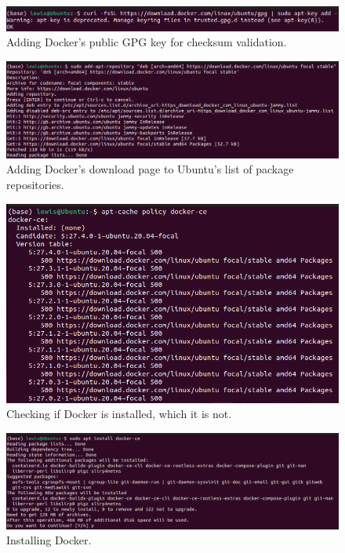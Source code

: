 \documentclass[12pt]{report}
\begin{document}
\begin{figure}[H]
    \centering
    \includegraphics[width=\linewidth]{Implementation/Docker/Installation/2.png}
    \caption{Adding Docker's public GPG key for checksum validation.}
    \label{fig:DockerInstall2}
\end{figure}

\begin{figure}[H]
    \centering
    \includegraphics[width=\linewidth]{Implementation/Docker/Installation/3.png}
    \caption{Adding Docker's download page to Ubuntu's list of package repositories.}
    \label{fig:DockerInstall3}
\end{figure}

\begin{figure}[H]
    \centering
    \includegraphics[width=\linewidth]{Implementation/Docker/Installation/4.png}
    \caption{Checking if Docker is installed, which it is not.}
    \label{fig:DockerInstall4}
\end{figure}

\begin{figure}[H]
    \centering
    \includegraphics[width=\linewidth]{Implementation/Docker/Installation/5.png}
    \caption{Installing Docker.}
    \label{fig:DockerInstall5}
\end{figure}
\end{document}
